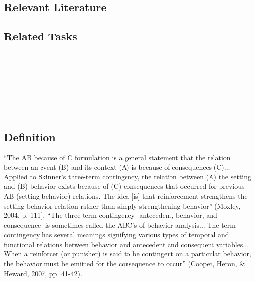 \subsection{Relevant Literature}
\begin{refsection}
\nocite{test,alang2017police,clayton2018black}
\printbibliography[heading=none]
\end{refsection}
\subsection{Related Tasks}
\foureOne{}\\
\fourFKTwentyFive{}\\
\fourFKTwentySix{}\\
\fourFKTwentySeven{}\\
\fourFKTwentyEight{}\\
\fourFKTwentyNine{}\\
%
%
%
%
%
%
\section{\fourFKThirtyOne{}}
\subsection{Definition}
``The AB because of C formulation is a general statement that the relation between an event (B) and its context (A) is because of consequences (C)... Applied to Skinner's three-term contingency, the relation between (A) the setting and (B) behavior exists because of (C) consequences that occurred for previous AB (setting-behavior) relations. The idea [is] that reinforcement strengthens the setting-behavior relation rather than simply strengthening behavior'' (Moxley, 2004, p. 111).
``The three term contingency- antecedent, behavior, and consequence- is sometimes called the ABC's of behavior analysis... The term contingency has several meanings signifying various types of temporal and functional relations between behavior and antecedent and consequent variables... When a reinforcer (or punisher) is said to be contingent on a particular behavior, the behavior must be emitted for the consequence to occur'' (Cooper, Heron, \& Heward, 2007, pp. 41-42).
%
